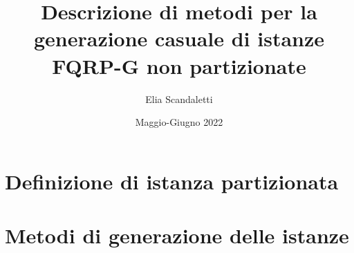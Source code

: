 \documentclass{article}
\title{Descrizione di metodi per la generazione casuale di istanze FQRP-G non partizionate}
\author{Elia Scandaletti}
\date{Maggio-Giugno 2022}
\theoremstyle{definition}
\begin{document}
\maketitle

\tableofcontents

\section{Definizione di istanza partizionata}


\section{Metodi di generazione delle istanze}

\end{document}
